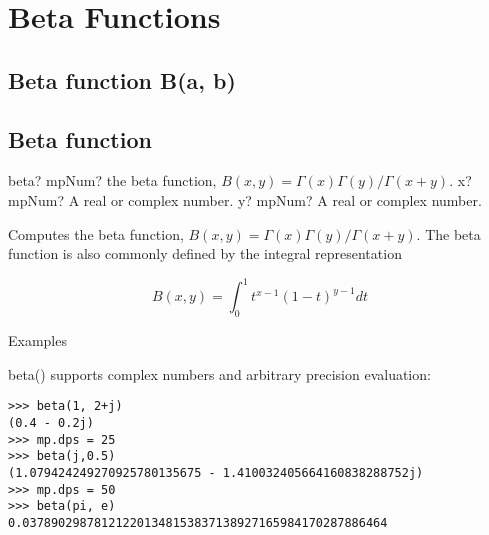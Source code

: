 \newpage
\section{Beta Functions}

\subsection{Beta function B(a, b)}

%



\subsection{Beta function}

\begin{mpFunctionsExtract}
	\mpFunctionTwo
	{beta? mpNum? the beta function, $B(x,y)=\Gamma(x) \Gamma(y)/\Gamma(x+y)$.}
	{x? mpNum? A real or complex number.}
	{y? mpNum? A real or complex number.}	
\end{mpFunctionsExtract}

\vpara
Computes the beta function, $B(x,y)=\Gamma(x) \Gamma(y)/\Gamma(x+y)$. The beta function is also commonly defined by the integral representation

\begin{equation}
B(x,y)=\int_0^1 t^{x-1}(1-t)^{y-1} dt
\end{equation}

Examples

beta() supports complex numbers and arbitrary precision evaluation:

\begin{lstlisting}
>>> beta(1, 2+j)
(0.4 - 0.2j)
>>> mp.dps = 25
>>> beta(j,0.5)
(1.079424249270925780135675 - 1.410032405664160838288752j)
>>> mp.dps = 50
>>> beta(pi, e)
0.037890298781212201348153837138927165984170287886464
\end{lstlisting}





